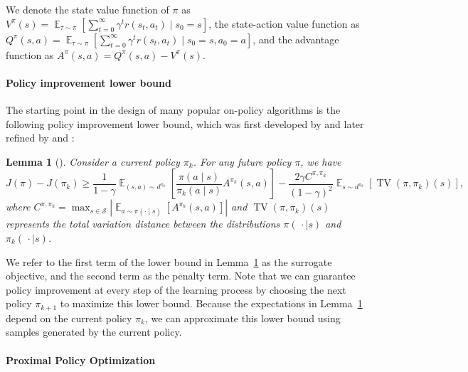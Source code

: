 \documentclass{article}
\newtheorem{lemma}{Lemma}
\begin{document}
We denote the state value function of $\pi$ as $V^{\pi}(s) = \mathop{\mathbb{E}}_{\tau \sim \pi} \left[ \sum_{t=0}^{\infty} \gamma^t r(s_t,a_t) \mid s_0 = s \right]$, the state-action value function as $Q^{\pi}(s,a) = \mathop{\mathbb{E}}_{\tau \sim \pi} \left[ \sum_{t=0}^{\infty} \gamma^t r(s_t,a_t) \mid s_0 = s, a_0 = a \right]$, and the advantage function as $A^{\pi}(s,a) = Q^{\pi}(s,a) - V^{\pi}(s)$.

\paragraph{Policy improvement lower bound}

The starting point in the design of many popular on-policy algorithms is the following policy improvement lower bound, which was first developed by \citet{kakade_2002} and later refined by \citet{schulman_2015} and \citet{achiam_2017}:

\begin{lemma}[\citet{achiam_2017}]\label{lem:pd_lb}
Consider a current policy $\pi_k$. For any future policy $\pi$, we have
\begin{equation}
J(\pi) - J(\pi_k) \geq \frac{1}{1-\gamma} \mathop{\mathbb{E}}_{(s,a) \sim d^{\pi_k}} \left[ \frac{\pi(a \mid s)}{\pi_k(a \mid s)} A^{\pi_k}(s,a) \right] - \frac{2\gamma C^{\pi,\pi_k}}{(1-\gamma)^2} \mathop{\mathbb{E}}_{s \sim d^{\pi_k}} \left[ \operatorname{TV}(\pi,\pi_k)(s) \right],
\end{equation}
where $C^{\pi,\pi_k} = \max_{s \in \mathcal{S}} \left| \mathop{\mathbb{E}}_{a \sim \pi(\cdot \mid s)} \left[ A^{\pi_k}(s,a) \right] \right|$ and $\operatorname{TV}(\pi,\pi_k)(s)$ represents the total variation distance between the distributions $\pi(\, \cdot \mid s)$ and $\pi_k(\, \cdot \mid s)$. 
\end{lemma}

We refer to the first term of the lower bound in Lemma~\ref{lem:pd_lb} as the surrogate objective, and the second term as the penalty term. Note that we can guarantee policy improvement at every step of the learning process by choosing the next policy $\pi_{k+1}$ to maximize this lower bound. Because the expectations in Lemma~\ref{lem:pd_lb} depend on the current policy $\pi_k$, we can approximate this lower bound using samples generated by the current policy.

\paragraph{Proximal Policy Optimization}
\end{document}
